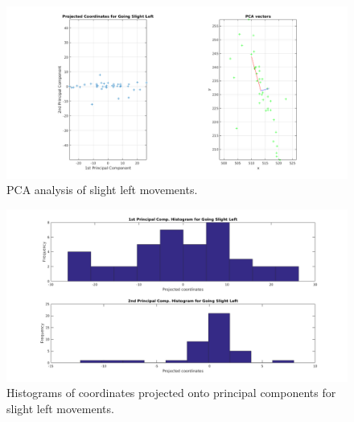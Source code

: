 \documentclass[paper=a4, fontsize=11pt]{scrartcl} %
\begin{document}
    \begin{figure}[h!]
        \begin{center}
            \setlength{\fboxsep}{0.5pt} %
            \setlength{\fboxrule}{0.5pt}
            \includegraphics[width=\linewidth,fbox]{images/pca_slightLeft.png}
            \caption{PCA analysis of slight left movements.}
        \end{center}
    \end{figure}

    \begin{figure}[h!]
        \begin{center}
            \setlength{\fboxsep}{0.5pt} %
            \setlength{\fboxrule}{0.5pt}
            \includegraphics[width=\linewidth,fbox]{images/pca_histogram_slightLeft.png}
            \caption{Histograms of coordinates projected onto principal components for slight left movements.}
        \end{center}
    \end{figure}

    \newpage
\end{document}
